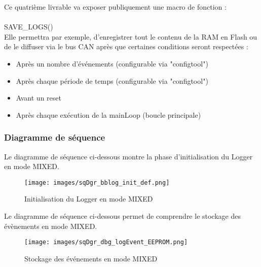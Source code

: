 \documentclass[a4paper, 12pt]{report}
\begin{document}
       Ce quatrième livrable va exposer publiquement une macro de fonction :\\
    \\
    {\color{green}SAVE\_LOGS}()
    \\

    Elle permettra par exemple, d'enregistrer tout le contenu de la RAM en Flash ou de le diffuser via le bus CAN après que certaines conditions seront respectées :
    \begin{itemize}
        \item Après un nombre d'événements (configurable via "configtool")
        \item Après chaque période de temps (configurable via "configtool")
        \item Avant un reset
        \item Après chaque exécution de la mainLoop (boucle principale)
    \end{itemize}

    
    \subsubsection{Diagramme de séquence}
    Le diagramme de séquence ci-dessous montre la phase d'initialisation du Logger en mode MIXED.


    \begin{figure}[H]
            \centering
            \texttt{[image: images/sqDgr\_bblog\_init\_def.png]}
            \caption{Initialisation du Logger en mode MIXED}
            \label{fig:initFlash}
    \end{figure}


    Le diagramme de séquence ci-dessous permet de comprendre le stockage des évènements en mode MIXED.

    \begin{figure}[H]
        \centering
        \texttt{[image: images/sqDgr\_dbg\_logEvent\_EEPROM.png]}
         \caption{Stockage des événements en mode MIXED}
        \label{fig:eepWrite}
    \end{figure}
    
            



\end{document}
